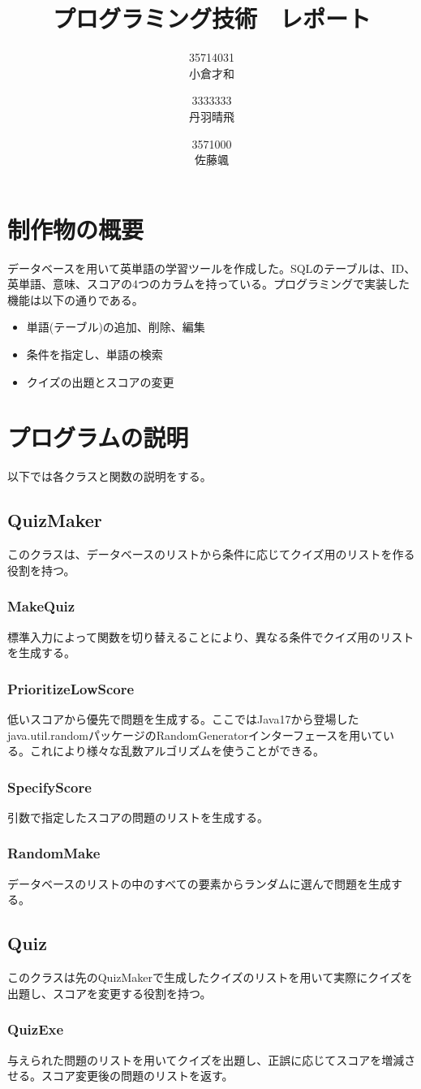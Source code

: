 \documentclass{ltjsarticle}
\title{プログラミング技術　レポート}
\author{35714031 \\ 小倉才和 \and 3333333 \\ 丹羽晴飛 \and 3571000 \\ 佐藤颯}
\date{\empty}
\begin{document}
\maketitle
\section{制作物の概要}
データベースを用いて英単語の学習ツールを作成した。SQLのテーブルは、ID、英単語、意味、スコアの4つのカラムを持っている。プログラミングで実装した機能は以下の通りである。
\begin{itemize}
    \item 単語(テーブル)の追加、削除、編集
    \item 条件を指定し、単語の検索
    \item クイズの出題とスコアの変更
\end{itemize}

\section{プログラムの説明}
以下では各クラスと関数の説明をする。
\subsection{QuizMaker}
このクラスは、データベースのリストから条件に応じてクイズ用のリストを作る役割を持つ。
\subsubsection{MakeQuiz}
標準入力によって関数を切り替えることにより、異なる条件でクイズ用のリストを生成する。
\subsubsection{PrioritizeLowScore}
低いスコアから優先で問題を生成する。ここではJava17から登場したjava.util.randomパッケージのRandomGeneratorインターフェースを用いている。これにより様々な乱数アルゴリズムを使うことができる。
\subsubsection{SpecifyScore}
引数で指定したスコアの問題のリストを生成する。
\subsubsection{RandomMake}
データベースのリストの中のすべての要素からランダムに選んで問題を生成する。

\subsection{Quiz}
このクラスは先のQuizMakerで生成したクイズのリストを用いて実際にクイズを出題し、スコアを変更する役割を持つ。
\subsubsection{QuizExe}
与えられた問題のリストを用いてクイズを出題し、正誤に応じてスコアを増減させる。スコア変更後の問題のリストを返す。
\end{document}
